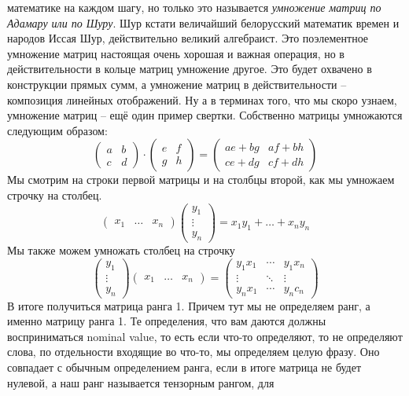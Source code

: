 математике на каждом шагу, но только это называется \emph{умножение 
матриц по Адамару или по Шуру}. Шур кстати величайший белорусский
математик времен и народов Иссая Шур, действительно великий алгебраист.
Это поэлементное умножение матриц настоящая очень хорошая и важная
операция, но в действительности в кольце матриц умножение другое. Это
будет охвачено в конструкции прямых сумм, а умножение матриц в
действительности – композиция линейных отображений. Ну а в терминах
того, что мы скоро узнаем, умножение матриц – ещё один пример свертки.
Собственно матрицы умножаются следующим образом:
\[\begin{pmatrix}
    a & b\\
    c & d
\end{pmatrix}\cdot
\begin{pmatrix}
    e & f\\
    g & h
\end{pmatrix} =
\begin{pmatrix}
    ae+bg & af+bh\\
    ce+dg & cf+dh
\end{pmatrix}\]
Мы смотрим на строки первой матрицы и на столбцы второй, как мы умножаем
строчку на столбец.
\[\begin{pmatrix}x_1 & \ldots & x_n\end{pmatrix}
\begin{pmatrix}y_1\\ \vdots\\ y_n\end{pmatrix} =
x_1y_1+\ldots+x_ny_n\]
Мы также можем умножать столбец на строчку
\[\begin{pmatrix}y_1\\ \vdots\\ y_n\end{pmatrix}
\begin{pmatrix}x_1 & \ldots & x_n\end{pmatrix} =
\begin{pmatrix}
    y_1x_1 & \cdots & y_1x_n \\
    \vdots & \ddots & \vdots\\
    y_nx_1 & \cdots & y_nc_n
\end{pmatrix}\]
В итоге получиться матрица ранга 1. Причем тут мы не определяем ранг, а
именно матрицу ранга 1. Те определения, что вам даются должны
восприниматься nominal value, то есть если что-то определяют, то не
определяют слова, по отдельности входящие во что-то, мы определяем
целую фразу. Оно совпадает с обычным определением ранга, если в итоге
матрица не будет нулевой, а наш ранг называется тензорным рангом, для
